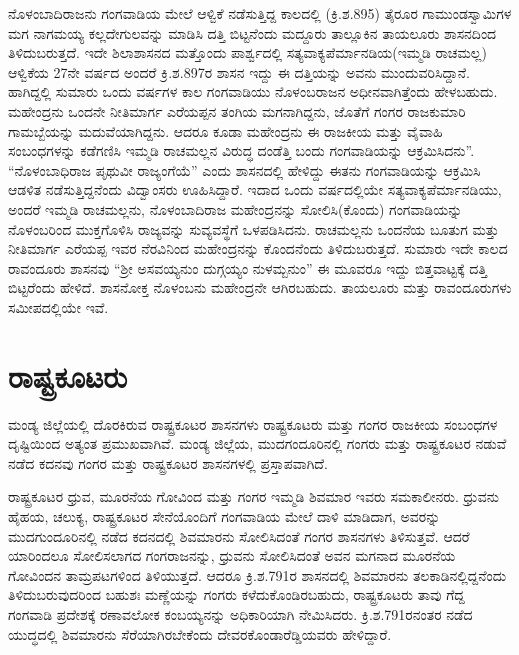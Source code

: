 ನೊಳಂಬಾದಿರಾಜನು ಗಂಗವಾಡಿಯ ಮೇಲೆ ಆಳ್ವಿಕೆ ನಡೆಸುತ್ತಿದ್ದ ಕಾಲದಲ್ಲಿ (ಕ್ರಿ.ಶ.895) ತೈರೂರ ಗಾಮುಂಡಸ್ವಾಮಿ\-ಗಳ ಮಗ ನಾಗಮಯ್ಯ ಕಲ್ಲದೇಗುಲವನ್ನು ಮಾಡಿಸಿ ದತ್ತಿ ಬಿಟ್ಟನೆಂದು ಮದ್ದೂರು ತಾಲ್ಲೂಕಿನ ತಾಯಲೂರು ಶಾಸನದಿಂದ ತಿಳಿದುಬರುತ್ತದೆ. ಇದೇ ಶಿಲಾಶಾಸನದ ಮತ್ತೊಂದು ಪಾರ್ಶ್ವದಲ್ಲಿ ಸತ್ಯವಾಕ್ಯಪೆರ್ಮಾನಡಿಯ(ಇಮ್ಮಡಿ ರಾಚಮಲ್ಲ) ಆಳ್ವಿಕೆಯ 27ನೇ ವರ್ಷದ ಅಂದರೆ ಕ್ರಿ.ಶ.897ರ ಶಾಸನ ಇದ್ದು ಈ ದತ್ತಿಯನ್ನು ಅವನು ಮುಂದುವರಿಸಿದ್ದಾನೆ. ಹಾಗಿದ್ದಲ್ಲಿ ಸುಮಾರು ಒಂದು ವರ್ಷಗಳ ಕಾಲ ಗಂಗವಾಡಿಯು ನೊಳಂಬರಾಜನ ಅಧೀನವಾಗಿತ್ತೆಂದು ಹೇಳಬಹುದು. ಮಹೇಂದ್ರನು ಒಂದನೇ ನೀತಿಮಾರ್ಗ ಎರೆಯಪ್ಪನ ತಂಗಿಯ ಮಗನಾಗಿದ್ದನು, ಜೊತೆಗೆ ಗಂಗರ ರಾಜಕುಮಾರಿ ಗಾಮಬ್ಬೆಯನ್ನು ಮದುವೆ\-ಯಾಗಿದ್ದನು. ಆದರೂ ಕೂಡಾ ಮಹೇಂದ್ರನು ಈ ರಾಜಕೀಯ ಮತ್ತು ವೈವಾಹಿ ಸಂಬಂಧಗಳನ್ನು ಕಡೆಗಣಿಸಿ ಇಮ್ಮಡಿ ರಾಚಮಲ್ಲನ ವಿರುದ್ಧ ದಂಡೆತ್ತಿ ಬಂದು ಗಂಗವಾಡಿಯನ್ನು ಆಕ್ರಮಿಸಿದನು”. “ನೊಳಂಬಾಧಿರಾಜ ಪೃಥುವೀ ರಾಜ್ಯಂಗೆಯೆ” ಎಂದು ಶಾಸನದಲ್ಲಿ ಹೇಳಿದ್ದು ಈತನು ಗಂಗವಾಡಿಯನ್ನು ಆಕ್ರಮಿಸಿ ಆಡಳಿತ ನಡೆಸುತ್ತಿದ್ದನೆಂದು ವಿದ್ವಾಂಸರು ಊಹಿಸಿದ್ದಾರೆ. ಇದಾದ ಒಂದು ವರ್ಷದಲ್ಲಿಯೇ ಸತ್ಯವಾಕ್ಯಪೆರ್ಮಾನಡಿಯು, ಅಂದರೆ ಇಮ್ಮಡಿ ರಾಚಮಲ್ಲನು, ನೊಳಂಬಾದಿರಾಜ ಮಹೇಂದ್ರನನ್ನು ಸೋಲಿಸಿ(ಕೊಂದು) ಗಂಗವಾಡಿಯನ್ನು ನೊಳಂಬರಿಂದ ಮುಕ್ತಗೊಳಿಸಿ ರಾಜ್ಯವನ್ನು ಸುವ್ಯವಸ್ಥೆಗೆ ಒಳಪಡಿ\-ಸಿದನು. ರಾಚಮಲ್ಲನು ಒಂದನೆಯ ಬೂತುಗ ಮತ್ತು ನೀತಿಮಾರ್ಗ ಎರೆಯಪ್ಪ ಇವರ ನೆರವಿನಿಂದ ಮಹೇಂದ್ರನನ್ನು ಕೊಂದನೆಂದು ತಿಳಿದುಬರುತ್ತದೆ. ಸುಮಾರು ಇದೇ ಕಾಲದ ರಾವಂದೂರು ಶಾಸನವು “ಶ‍್ರೀ ಅಸವಯ್ಯನುಂ ದುಗ್ಗಯ್ಯಂ ನುಳಮ್ಬನುಂ” ಈ ಮೂವರೂ ಇದ್ದು ಬಿತ್ತವಾಟ್ಟಕ್ಕೆ ದತ್ತಿ ಬಿಟ್ಟರೆಂದು ಹೇಳಿದೆ. ಶಾಸನೋಕ್ತ ನೊಳಂಬನು ಮಹೇಂದ್ರನೇ ಆಗಿರಬಹುದು. ತಾಯಲೂರು ಮತ್ತು ರಾವಂದೂರುಗಳು ಸಮೀಪದಲ್ಲಿಯೇ ಇವೆ.


\section{ರಾಷ್ಟ್ರಕೂಟರು}

ಮಂಡ್ಯ ಜಿಲ್ಲೆಯಲ್ಲಿ ದೊರಕಿರುವ ರಾಷ್ಟ್ರಕೂಟರ ಶಾಸನಗಳು ರಾಷ್ಟ್ರಕೂಟರು ಮತ್ತು ಗಂಗರ ರಾಜಕೀಯ ಸಂಬಂಧಗಳ ದೃಷ್ಟಿಯಿಂದ ಅತ್ಯಂತ ಪ್ರಮುಖವಾಗಿವೆ. ಮಂಡ್ಯ ಜಿಲ್ಲೆಯ, ಮುದಗಂದೂರಿನಲ್ಲಿ ಗಂಗರು ಮತ್ತು ರಾಷ್ಟ್ರಕೂಟರ ನಡುವೆ ನಡೆದ ಕದನವು ಗಂಗರ ಮತ್ತು ರಾಷ್ಟ್ರಕೂಟರ ಶಾಸನಗಳಲ್ಲಿ ಪ್ರಸ್ತಾಪವಾಗಿದೆ.

ರಾಷ್ಟ್ರಕೂಟರ ಧ್ರುವ, ಮೂರನೆಯ ಗೋವಿಂದ ಮತ್ತು ಗಂಗರ ಇಮ್ಮಡಿ ಶಿವಮಾರ ಇವರು ಸಮಕಾಲೀನರು. ಧ್ರುವನು ಹೈಹಯ, ಚಲುಕ್ಯ, ರಾಷ್ಟ್ರಕೂಟರ ಸೇನೆಯೊಂದಿಗೆ ಗಂಗವಾಡಿಯ ಮೇಲೆ ದಾಳಿ ಮಾಡಿದಾಗ, ಅವರನ್ನು ಮುದಗುಂದೂರಿನಲ್ಲಿ ನಡೆದ ಕದನದಲ್ಲಿ ಶಿವಮಾರನು ಸೋಲಿಸಿದಂತೆ ಗಂಗರ ಶಾಸನಗಳು ತಿಳಿಸುತ್ತವೆ. ಆದರೆ ಯಾರಿಂದಲೂ ಸೋಲಿಸಲಾಗದ ಗಂಗರಾಜನನ್ನು, ಧ್ರುವನು ಸೋಲಿಸಿದಂತೆ ಅವನ ಮಗನಾದ ಮೂರನೆಯ ಗೋವಿಂದನ ತಾಮ್ರಪಟಗಳಿಂದ ತಿಳಿಯುತ್ತದೆ. ಆದರೂ ಕ್ರಿ.ಶ.791ರ ಶಾಸನದಲ್ಲಿ ಶಿವಮಾರನು ತಲಕಾಡಿನಲ್ಲಿದ್ದನೆಂದು ತಿಳಿದುಬರುವುದ\-ರಿಂದ ಬಹುಶಃ ಮಣ್ಣೆಯನ್ನು ಗಂಗರು ಕಳೆದುಕೊಂಡಿರಬಹುದು, ರಾಷ್ಟ್ರಕೂಟರು ತಾವು ಗೆದ್ದ ಗಂಗವಾಡಿ ಪ್ರದೇಶಕ್ಕೆ ರಣಾವಲೋಕ ಕಂಬಯ್ಯನನ್ನು ಅಧಿಕಾರಿಯಾಗಿ ನೇಮಿಸಿದರು. ಕ್ರಿ.ಶ.791ರನಂತರ ನಡೆದ ಯುದ್ಧದಲ್ಲಿ ಶಿವಮಾರನು ಸೆರೆಯಾಗಿರಬೇಕೆಂದು ದೇವರಕೊಂಡಾರೆಡ್ಡಿಯವರು ಹೇಳಿದ್ದಾರೆ.

